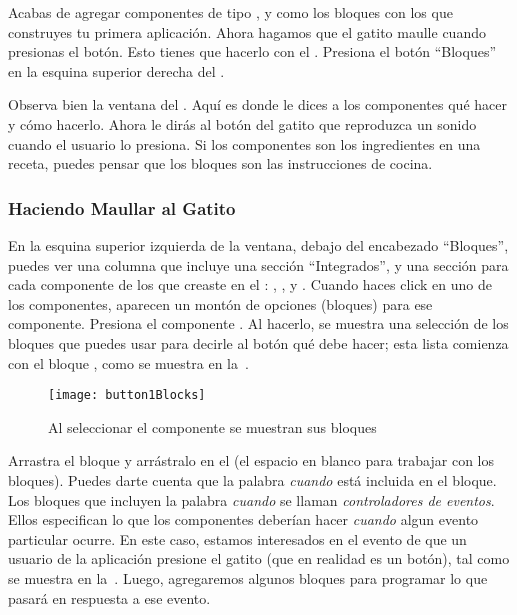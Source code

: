Acabas de agregar componentes de tipo ,
 y  como los bloques con los que
construyes tu primera aplicación. Ahora hagamos que el gatito maulle
cuando presionas el botón. Esto tienes que hacerlo con el
\blockEditor. Presiona el botón ``Bloques'' en la esquina superior
derecha del \componentDesigner.

Observa bien la ventana del \blockEditor. Aquí es donde le dices a los
componentes qué hacer y cómo hacerlo. Ahora le dirás al botón del
gatito que reproduzca un sonido cuando el usuario lo presiona. Si los
componentes son los ingredientes en una receta, puedes pensar que los
bloques son las instrucciones de cocina.

\subsubsection*{Haciendo Maullar al Gatito}

En la esquina superior izquierda de la ventana, debajo del encabezado
``Bloques'', puedes ver una columna que incluye una sección
``Integrados'', y una sección para cada componente de los que creaste
en el \designer: , , y
. Cuando haces click en uno de los componentes,
aparecen un montón de opciones (bloques) para ese componente. Presiona
el componente . Al hacerlo, se muestra una selección
de los bloques que puedes usar para decirle al botón qué debe hacer;
esta lista comienza con el bloque , como se
muestra en la~.

\begin{figure}[H]
\centering
\texttt{[image: button1Blocks]}
\caption{Al seleccionar el componente  se muestran
  sus bloques}
\label{fig:button1Blocks}
\end{figure}

Arrastra el bloque  y arrástralo en el \viewer (el
espacio en blanco para trabajar con los bloques). Puedes darte cuenta
que la palabra \emph{cuando} está incluida en el bloque. Los bloques
que incluyen la palabra \emph{cuando} se llaman \emph{controladores de
  eventos}. Ellos especifican lo que los componentes deberían hacer
\emph{cuando} algun evento particular ocurre. En este caso, estamos
interesados en el evento de que un usuario de la aplicación presione
el gatito (que en realidad es un botón), tal como se muestra en
la~. Luego, agregaremos algunos bloques
para programar lo que pasará en respuesta a ese evento.

